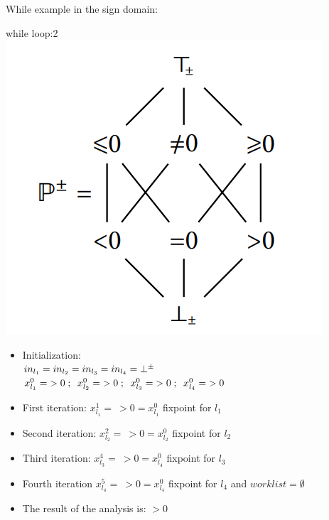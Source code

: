 \begin{frame}{While example in the sign domain:}
\begin{exampleblock}{while loop:2}
	\centering 
	\centering \includegraphics[scale=0.60]{content/images/static-analysis/sign1.png}
	
	\begin{itemize}
		\item Initialization: 
		\\ $\scriptsize in_{l_1}=in_{l_2}=in_{l_3}=in_{l_4}=\bot^{\pm}$
		\\ $\scriptsize x_{l_1}^0 =~>0~;~~x_{l_2}^0 =~>0~;~~x_{l_3}^0 =~>0~;~~x_{l_4}^0 =~>0~~~$
		
		\item First iteration: $x_{l_1}^1 = ~>0 = x_{l_1}^0 $ fixpoint for $l_1$ 
		\item Second iteration: $x_{l_2}^2 = ~>0  =  x_{l_2}^0 $ fixpoint for $l_2$ 
		\item Third iteration: $x_{l_3}^4 = ~>0 = x_{l_4}^0 $ fixpoint for $l_3$ 
		\item Fourth iteration $x_{l_4}^5 =~ >0 = x_{l_4}^0 $ fixpoint for $l_4$ and $worklist=\emptyset$
		\item The result of the analysis is: $>0$
	\end{itemize}
\end{exampleblock}
\end{frame}

